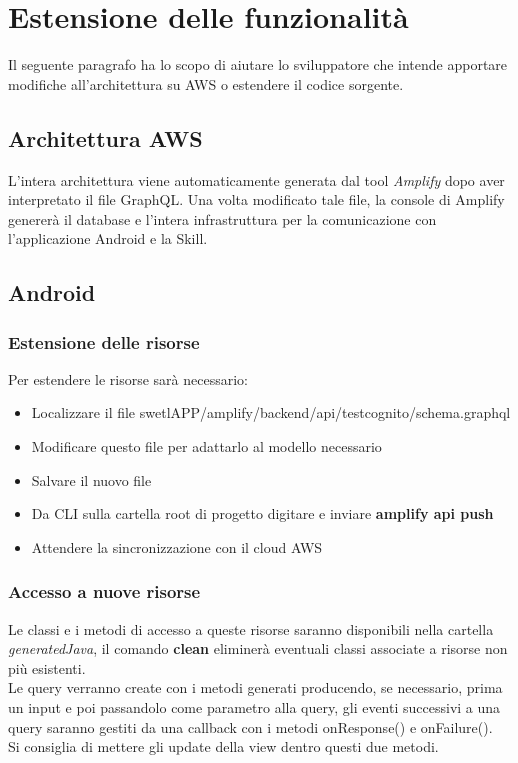 \pagebreak

\section{Estensione delle funzionalità}
Il seguente paragrafo ha lo scopo di aiutare lo sviluppatore che intende apportare modifiche all'architettura su AWS o estendere il codice sorgente.

\subsection{Architettura AWS}
L'intera architettura viene automaticamente generata dal tool \emph{Amplify} dopo aver interpretato il file GraphQL. Una volta modificato tale file, la console di Amplify genererà il database e l'intera infrastruttura per la comunicazione con l'applicazione Android e la Skill.\\[0.25cm]

\subsection{Android}
\label{sec:estensioni-android}
\subsubsection{Estensione delle risorse}
Per estendere le risorse sarà necessario:
\begin{itemize}
\item Localizzare il file swetlAPP/amplify/backend/api/testcognito/schema.graphql
\item Modificare questo file per adattarlo al modello necessario
\item Salvare il nuovo file
\item Da CLI sulla cartella root di progetto digitare e inviare \textbf{amplify api push}
\item Attendere la sincronizzazione con il cloud AWS
\end{itemize}

\subsubsection{Accesso a nuove risorse}
Le classi e i metodi di accesso a queste risorse saranno disponibili nella cartella \emph{generatedJava}, il comando \textbf{clean} eliminerà eventuali  classi associate a risorse non più esistenti. \\
Le query verranno create con i metodi generati producendo, se necessario, prima un input e poi passandolo come parametro alla query, gli eventi successivi a una query saranno gestiti da una callback con i metodi onResponse() e onFailure(). \\
Si consiglia di mettere gli update della view dentro questi due metodi.

